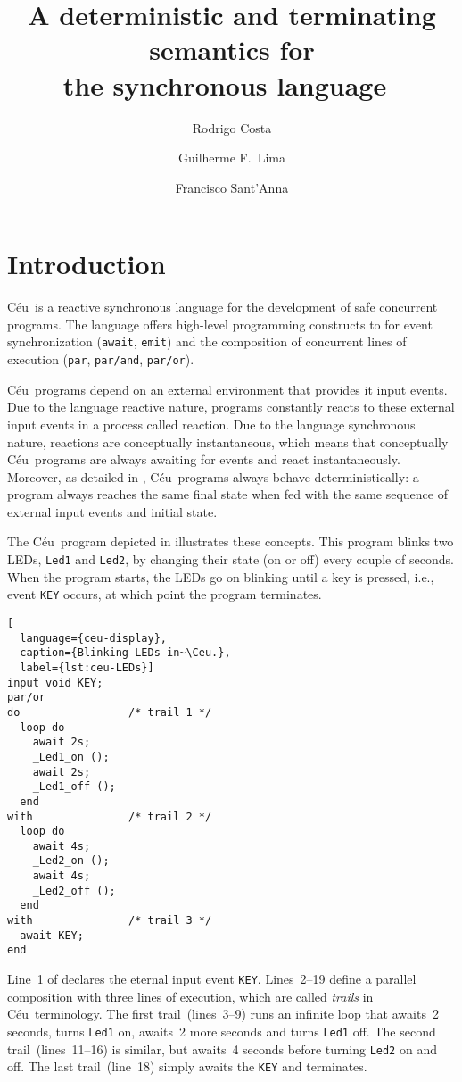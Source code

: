 \documentclass[10pt,a4paper,oneside,leqno]{article}
\title{A deterministic and terminating semantics for\\
  the synchronous language~\Ceu}
\author{Rodrigo Costa \and Guilherme F.~Lima \and Francisco Sant'Anna}
\numberwithin{equation}{section}
\def\Ceu{C\'eu}
\def\ceulst#1{\lstinline[language=ceu,basicstyle=\ttfamily]|#1|}
\begin{document}
\maketitle


\section{Introduction}
\label{sec:intro}

\Ceu\ is a reactive synchronous language for the development of safe
concurrent programs. The language offers high-level programming constructs
to for event synchronization (\ceulst{await}, \ceulst{emit}) and the
composition of concurrent lines of execution (\ceulst{par},
\ceulst{par/and}, \ceulst{par/or}).

\Ceu\ programs depend on an external environment that provides it input
events.  Due to the language reactive nature, programs constantly reacts to
these external input events in a process called reaction.  Due to the
language synchronous nature, reactions are conceptually instantaneous, which
means that conceptually \Ceu\ programs are always awaiting for events and
react instantaneously.  Moreover, as detailed in , \Ceu\
programs always behave deterministically: a program always reaches the same
final state when fed with the same sequence of external input events and
initial state.

The \Ceu\ program depicted in  illustrates these
concepts.  This program blinks two LEDs, \ceulst{Led1} and \ceulst{Led2}, by
changing their state (on or off) every couple of seconds.  When the program
starts, the LEDs go on blinking until a key is pressed, i.e., event
\ceulst{KEY} occurs, at which point the program terminates.

\begin{lstlisting}[
  language={ceu-display},
  caption={Blinking LEDs in~\Ceu.},
  label={lst:ceu-LEDs}]
input void KEY;
par/or
do                 /* trail 1 */
  loop do
    await 2s;
    _Led1_on ();
    await 2s;
    _Led1_off ();
  end
with               /* trail 2 */
  loop do
    await 4s;
    _Led2_on ();
    await 4s;
    _Led2_off ();
  end
with               /* trail 3 */
  await KEY;
end
\end{lstlisting}

Line~1 of  declares the eternal input event \ceulst{KEY}.
Lines~2--19 define a parallel composition with three lines of execution,
which are called \emph{trails} in \Ceu\ terminology.  The first
trail~(lines~3--9) runs an infinite loop that awaits~2 seconds, turns
\ceulst{Led1} on, awaits~2 more seconds and turns \ceulst{Led1} off.  The
second trail~(lines~11--16) is similar, but awaits~4 seconds before turning
\ceulst{Led2} on and off.  The last trail~(line~18) simply awaits the
\ceulst{KEY} and terminates.
\end{document}

